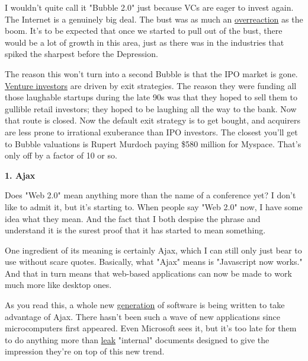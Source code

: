 I wouldn't quite call it
                    "Bubble 2.0" just because VCs are eager to invest again. The
                    Internet is a genuinely big deal. The bust was as much an
                    \href{http://www.paulgraham.com/bubble.html}{overreaction}
                    as the boom. It's to be expected that once we started to
                    pull out of the bust, there would be a lot of growth in this
                    area, just as there was in the industries that spiked the
                    sharpest before the Depression.

The reason this
                    won't turn into a second Bubble is that the IPO market is
                    gone.
                    \href{http://www.paulgraham.com/startupfunding.html}{Venture investors} are
                    driven by exit strategies. The reason they were funding all
                    those laughable startups during the late 90s was that they
                    hoped to sell them to gullible retail investors; they hoped
                    to be laughing all the way to the bank. Now that route is
                    closed. Now the default exit strategy is to get bought, and
                    acquirers are less prone to irrational exuberance than IPO
                    investors. The closest you'll get to Bubble valuations is
                    Rupert Murdoch paying \$580 million for Myspace. That's only
                    off by a factor of 10 or so.

\textbf{1. Ajax}

Does "Web 2.0" mean anything more than the name
                    of a conference yet? I don't like to admit it, but it's
                    starting to. When people say "Web 2.0" now, I have some idea
                    what they mean. And the fact that I both despise the phrase
                    and understand it is the surest proof that it has started to
                    mean something.

One ingredient of its meaning is
                    certainly Ajax, which I can still only just bear to use
                    without scare quotes. Basically, what "Ajax" means is
                    "Javascript now works." And that in turn means that
                    web-based applications can now be made to work much more
                    like desktop ones.

As you read this, a whole new
                    \href{http://online.wsj.com/public/article/SB113098635587487074.html?mod=todays\_
free\_feature}{generation}
                    of software is being written to take advantage of Ajax.
                    There hasn't been such a wave of new applications since
                    microcomputers first appeared. Even Microsoft sees it, but
                    it's too late for them to do anything more than
                    \href{http://www.hypercamp.org/2005/11/09}{leak}
                    "internal" documents designed to give the impression they're
                    on top of this new trend.

